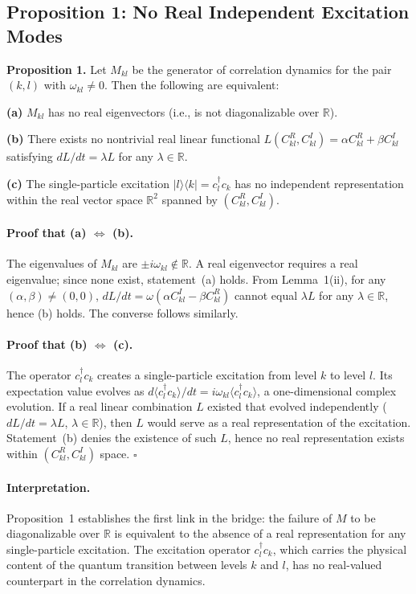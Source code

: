\documentclass[aps,pra,preprint,groupedaddress,amsmath,amssymb,floatfix]{revtex4-2}
\begin{document}
\subsection{Proposition 1: No Real Independent Excitation Modes}
\label{sec:th1_prop1}

\textbf{Proposition 1.} Let $M_{kl}$ be the generator of correlation dynamics for the pair $(k,l)$ with $\omega_{kl} \neq 0$. Then the following are equivalent:

\textbf{(a)} $M_{kl}$ has no real eigenvectors (i.e., is not diagonalizable over $\mathbb{R}$).

\textbf{(b)} There exists no nontrivial real linear functional $L(C^R_{kl}, C^I_{kl}) = \alpha C^R_{kl} + \beta C^I_{kl}$ satisfying $dL/dt = \lambda L$ for any $\lambda \in \mathbb{R}$.

\textbf{(c)} The single-particle excitation $|l\rangle\langle k| = c^\dagger_l c_k$ has no independent representation within the real vector space $\mathbb{R}^2$ spanned by $(C^R_{kl}, C^I_{kl})$.

\paragraph{Proof that (a) $\Leftrightarrow$ (b).} The eigenvalues of $M_{kl}$ are $\pm i\omega_{kl} \notin \mathbb{R}$. A real eigenvector requires a real eigenvalue; since none exist, statement~(a) holds. From Lemma~1(ii), for any $(\alpha,\beta) \neq (0,0)$, $dL/dt = \omega(\alpha C^I_{kl} - \beta C^R_{kl})$ cannot equal $\lambda L$ for any $\lambda \in \mathbb{R}$, hence (b) holds. The converse follows similarly.

\paragraph{Proof that (b) $\Leftrightarrow$ (c).} The operator $c^\dagger_l c_k$ creates a single-particle excitation from level $k$ to level $l$. Its expectation value evolves as $d\langle c^\dagger_l c_k\rangle/dt = i\omega_{kl} \langle c^\dagger_l c_k\rangle$, a one-dimensional complex evolution. If a real linear combination $L$ existed that evolved independently ($dL/dt = \lambda L$, $\lambda \in \mathbb{R}$), then $L$ would serve as a real representation of the excitation. Statement~(b) denies the existence of such $L$, hence no real representation exists within $(C^R_{kl}, C^I_{kl})$ space. $\square$

\paragraph{Interpretation.} Proposition~1 establishes the first link in the bridge: the failure of $M$ to be diagonalizable over $\mathbb{R}$ is equivalent to the absence of a real representation for any single-particle excitation. The excitation operator $c^\dagger_l c_k$, which carries the physical content of the quantum transition between levels $k$ and $l$, has no real-valued counterpart in the correlation dynamics.
\end{document}
